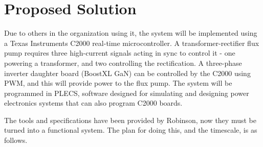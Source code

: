 \documentclass[11pt, a4paper, twoside, openright]{article}
\begin{document}
\section{Proposed Solution}

Due to others in the organization using it, the system will be implemented using a Texas Instruments C2000 real-time microcontroller. A transformer-rectifier flux pump requires three high-current signals acting in sync to control it - one powering a transformer, and two controlling the rectification.  A three-phase inverter daughter board (BoostXL GaN) can be controlled by the C2000 using PWM, and this will provide power to the flux pump. The system will be programmed in PLECS, software designed for simulating and designing power electronics systems that can also program C2000 boards.

The tools and specifications have been provided by Robinson, now they must be turned into a functional system. The plan for doing this, and the timescale, is as follows.
\end{document}
